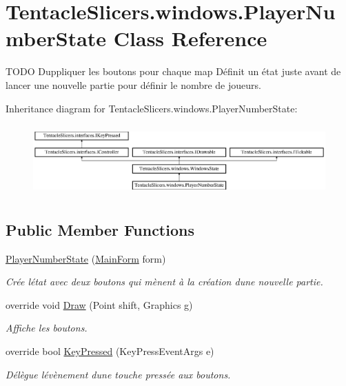 \hypertarget{class_tentacle_slicers_1_1windows_1_1_player_number_state}{}\section{Tentacle\+Slicers.\+windows.\+Player\+Number\+State Class Reference}
\label{class_tentacle_slicers_1_1windows_1_1_player_number_state}


T\+O\+DO Duppliquer les boutons pour chaque map Définit un état juste avant de lancer une nouvelle partie pour définir le nombre de joueurs.  


Inheritance diagram for Tentacle\+Slicers.\+windows.\+Player\+Number\+State\+:\begin{figure}[H]
\begin{center}
\leavevmode
\includegraphics[height=2.745098cm]{class_tentacle_slicers_1_1windows_1_1_player_number_state}
\end{center}
\end{figure}
\subsection*{Public Member Functions}
\begin{DoxyCompactItemize}
\item 
\hyperlink{class_tentacle_slicers_1_1windows_1_1_player_number_state_ac635e6edf7b3fef7faec5abc2be8337e}{Player\+Number\+State} (\hyperlink{class_tentacle_slicers_1_1windows_1_1_main_form}{Main\+Form} form)
\begin{DoxyCompactList}\small\item\em Crée l\textquotesingle{}état avec deux boutons qui mènent à la création d\textquotesingle{}une nouvelle partie. \end{DoxyCompactList}\item 
override void \hyperlink{class_tentacle_slicers_1_1windows_1_1_player_number_state_ac25c342f1262c61838013f2dcfa2a7af}{Draw} (Point shift, Graphics g)
\begin{DoxyCompactList}\small\item\em Affiche les boutons. \end{DoxyCompactList}\item 
override bool \hyperlink{class_tentacle_slicers_1_1windows_1_1_player_number_state_a1f54a4e1cab990b41058dc80624f1816}{Key\+Pressed} (Key\+Press\+Event\+Args e)
\begin{DoxyCompactList}\small\item\em Délègue l\textquotesingle{}évènement d\textquotesingle{}une touche pressée aux boutons. \end{DoxyCompactList}\end{DoxyCompactItemize}
